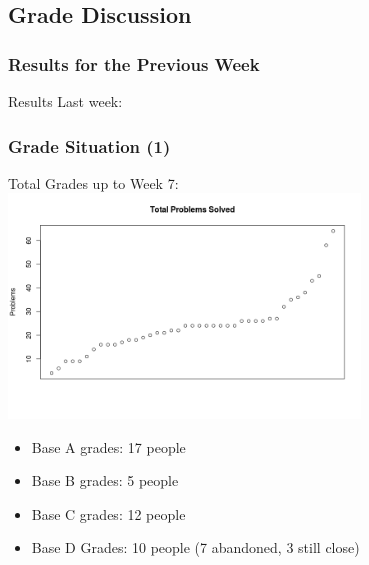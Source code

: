 \subsection{Grade Discussion}

\begin{frame}
  \frametitle{Results for the Previous Week}

  \begin{center}

    Results Last week:

  \end{center}
\end{frame}


\begin{frame}
  \frametitle{Grade Situation (1)}
  \begin{center}
    Total Grades up to Week 7:
    \includegraphics[width=0.7\textwidth]{img/totalproblemsW7}
    
    \medskip

    \begin{itemize}
    \item Base A grades: 17 people
    \item Base B grades: 5 people
    \item Base C grades: 12 people
    \item Base D Grades: 10 people (7 abandoned, 3 still close)
    \end{itemize}
  \end{center}
\end{frame}

